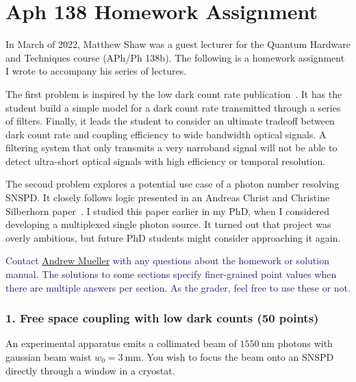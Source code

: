 \documentclass[11pt]{caltech_thesis} %
\begin{document}
\appendix

\hypertarget{aph-138-homework-assignment}{%
\chapter{Aph 138 Homework
Assignment}\label{aph-138-homework-assignment}}

In March of 2022, Matthew Shaw was a guest lecturer for the Quantum
Hardware and Techniques course (APh/Ph 138b). The following is a
homework assignment I wrote to accompany his series of lectures.

The first problem is inspired by the low dark count rate
publication~\autocite{Mueller:21}. It has the student
build a simple model for a dark count rate transmitted through a series
of filters. Finally, it leads the student to consider an ultimate
tradeoff between dark count rate and coupling efficiency to wide
bandwidth optical signals. A filtering system that only transmits a very
narroband signal will not be able to detect ultra-short optical signals
with high efficiency or temporal resolution.

The second problem explores a potential use case of a photon number
resolving SNSPD. It closely follows logic presented in an Andreas Christ
and Christine Silberhorn paper~\autocite{Andreas:12}. I
studied this paper earlier in my PhD, when I considered developing a
multiplexed single photon source. It turned out that project was overly
ambitious, but future PhD students might consider approaching it again.

\textcolor{midnightblue}{Contact
\href{mailto:andrewstermueller@gmail.com}{Andrew Mueller} with any
questions about the homework or solution manual. The solutions to some
sections specify finer-grained point values when there are multiple
answers per section. As the grader, feel free to use these or not. }

\hypertarget{free-space-coupling-with-low-dark-counts-50-points}{%
\subsection{1. Free space coupling with low dark counts (50
points)}\label{free-space-coupling-with-low-dark-counts-50-points}}

An experimental apparatus emits a collimated beam of $1550~\mathrm{nm}$
photons with gaussian beam waist $w_0 = 3~\mathrm{mm}$. You wish to
focus the beam onto an SNSPD directly through a window in a cryostat.
\end{document}
